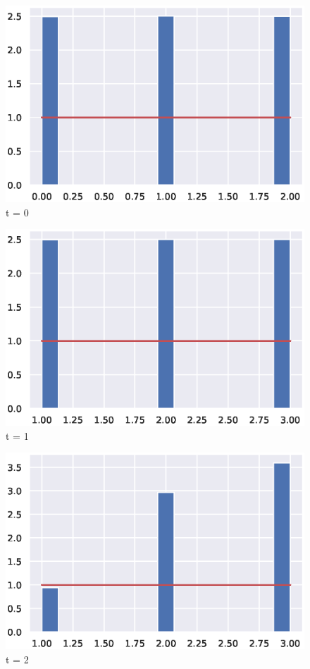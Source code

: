 \documentclass{homeworkclass}
\begin{document}
\begin{homeworkProblem}
\begin{homeworkSection}[d) Fazendo histogramas de cada uma das 4 colunas, calcule as distribuições de probabilidade do processo $X(t)$ em cada um dos 4 instantes: $t = 0, \, 1 \, 2 \, 3$. Comente os resultados obtidos.]
	\begin{figure}[!h]
		\centering
		\includegraphics[width=0.7\linewidth]{figs/t_zero}
		\caption{t = 0}
	\end{figure}

	\begin{figure}[!h]
		\centering
		\includegraphics[width=0.7\linewidth]{figs/t_um}
		\caption{t = 1}
	\end{figure}

	\begin{figure}[!h]
		\centering
		\includegraphics[width=0.7\linewidth]{figs/t_dois}
		\caption{t = 2}
	\end{figure}


\end{homeworkSection}
\end{homeworkProblem}
\end{document}
